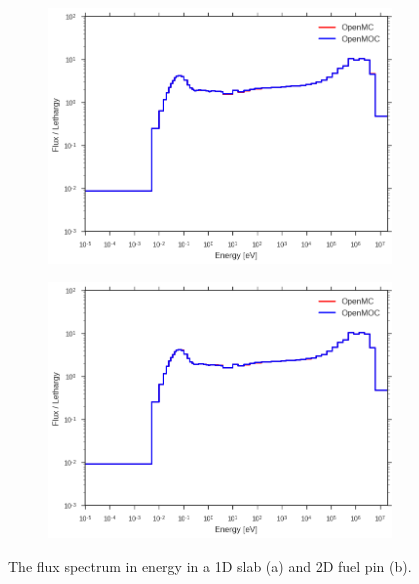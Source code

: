 \begin{figure}
\begin{subfigure}{0.9\textwidth}
  \centering
  \includegraphics[width=\linewidth]{figures/biases/slab/vol-avg-flux}
  \caption{}
\end{subfigure}
\begin{subfigure}{0.9\textwidth}
  \centering
  \includegraphics[width=\linewidth]{figures/biases/pin-cell/vol-avg-flux}
  \caption{}
\end{subfigure}
\caption[Flux spectrum in a slab and pin cell]{The flux spectrum in energy in a 1D slab (a) and 2D fuel pin (b).}
\label{fig:chap5-flux}
\end{figure}


